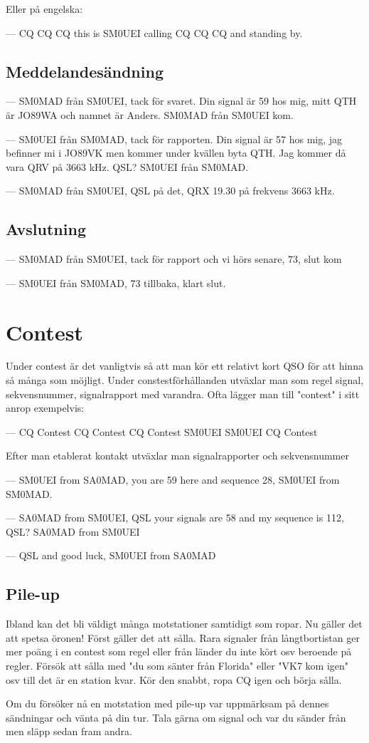 Eller på engelska:

--- CQ CQ CQ this is SM0UEI calling CQ CQ CQ and standing by.

\subsection{Meddelandesändning}

--- SM0MAD från SM0UEI, tack för svaret. Din signal är 59 hos mig, mitt QTH är JO89WA och namnet är Anders. SM0MAD från SM0UEI kom.

--- SM0UEI från SM0MAD, tack för rapporten. Din signal är 57 hos mig, jag befinner mi i JO89VK men kommer under kvällen byta QTH. Jag kommer då vara QRV på 3663 kHz. QSL? SM0UEI från SM0MAD.

--- SM0MAD från SM0UEI, QSL på det, QRX 19.30 på frekvens 3663 kHz. 

\subsection{Avslutning}

--- SM0MAD från SM0UEI, tack för rapport och vi hörs senare, 73, slut kom

--- SM0UEI från SM0MAD, 73 tillbaka, klart slut.

\section{Contest}

Under contest är det vanligtvis så att man kör ett relativt kort QSO för att hinna så många som möjligt. Under constestförhållanden utväxlar man som regel signal, sekvensnummer, signalrapport med varandra. Ofta lägger man till "contest" i sitt anrop exempelvis:

--- CQ Contest CQ Contest CQ Contest SM0UEI SM0UEI CQ Contest

Efter man etablerat kontakt utväxlar man signalrapporter och sekvensnummer

--- SM0UEI from SA0MAD, you are 59 here and sequence 28, SM0UEI from SM0MAD.

--- SA0MAD from SM0UEI, QSL your signals are 58 and my sequence is 112, QSL? SA0MAD from SM0UEI

--- QSL and good luck, SM0UEI from SA0MAD

\subsection{Pile-up}

Ibland kan det bli väldigt många motstationer samtidigt som ropar. Nu gäller det att spetsa öronen! Först gäller det att sålla. Rara signaler från långtbortistan ger mer poäng i en contest som regel eller från länder du inte kört osv beroende på regler. Försök att sålla med "du som sänter från Florida" eller "VK7 kom igen" osv till det är en station kvar. Kör den snabbt, ropa CQ igen och börja sålla.

Om du försöker nå en motstation med pile-up var uppmärksam på dennes sändningar och vänta på din tur. Tala gärna om signal och var du sänder från men släpp sedan fram andra. 